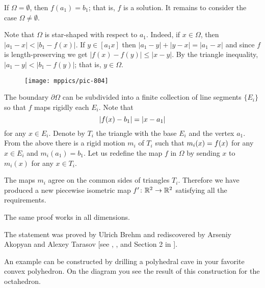 If $\Omega=\emptyset$,
then $f(a_1)=b_1$; 
that is, $f$ is a solution.
It remains to consider the case $\Omega\ne\emptyset$. 

Note that $\Omega$ is star-shaped with respect to $a_1$.
Indeed, if $x\in \Omega$, then $|a_1-x|<|b_1-f(x)|$.
If $y\in [a_1x]$ then 
$|a_1-y|+|y-x|=|a_1-x|$ and since $f$ is length-preserving we get $|f(x)-f(y)|\le |x-y|$.
By the triangle inequality, 
$|a_1-y|<|b_1-f(y)|$; that is, $y\in\Omega$. 

\begin{wrapfigure}{o}{47 mm}
\vskip-1mm
\centering
\texttt{[image: mppics/pic-804]}
\vskip-1mm
\end{wrapfigure}

The boundary $\partial\Omega$ can be subdivided into a finite collection of line segments $\{E_i\}$
so that $f$ maps rigidly each $E_i$.
Note that 
\[|f(x)\z-b_1|=|x-a_1|\]
for any $x\in E_i$.
Denote by $T_i$ the triangle with the base $E_i$ and the vertex $a_1$.
From the above there is a rigid motion $m_i$ of $T_i$ such that $m_i(x)\z=f(x)$ for any $x\in E_i$ and $m_i(a_1)=b_1$.
Let us redefine the map $f$ in $\Omega$ by sending $x$ to $m_i(x)$ for any $x\in T_i$.

The maps $m_i$ agree on the common sides of triangles $T_i$.
Therefore we have produced a new piecewise isometric map $f'\colon\mathbb{R}^2\to \mathbb{R}^2$ satisfying all the requirements.
\qeds

The same proof works in all dimensions.

The statement was proved by Ulrich Brehm 
and rediscovered by Arseniy Akopyan and Alexey Tarasov [see , , and Section 2 in ].


An example can be constructed by drilling a polyhedral cave in your favorite convex polyhedron.
On the diagram you see the result of this construction for the octahedron.

